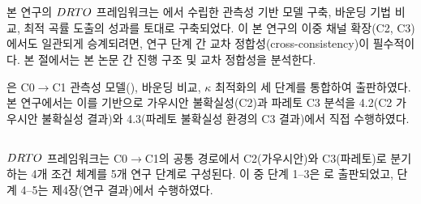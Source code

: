 

\section[\texorpdfstring{Lee and Cheung(2026)}{Lee and Cheung(2026)}과의 교차 정합성]{}
\label{sec:ch5_kci_cross}

본 연구의 $DRTO$ 프레임워크는 \citet{lee2026drto}에서 수립한
관측성 기반 모델 구축, 바운딩 기법 비교, 최적 곡률 도출의 성과를
토대로 구축되었다.
이 본 연구의
이중 채널 확장(C2, C3)에서도 일관되게 승계되려면,
연구 단계 간 교차 정합성(cross-consistency)이 필수적이다.
본 절에서는  본 논문 간 진행 구조 및 교차 정합성을 분석한다.

\citet{lee2026drto}은 C0$\to$C1 관측성 모델(),
바운딩 비교, $\kappa$ 최적화의 세 단계를 통합하여 출판하였다.
본 연구에서는 이를 기반으로 가우시안 불확실성(C2)과
파레토 C3 분석을 4.2(C2 가우시안 불확실성 결과)와 4.3(파레토 불확실성 환경의 C3 결과)에서 직접 수행하였다.


\subsection{}
\label{subsec:ch5_kci_progression}

$DRTO$ 프레임워크는 C0$\to$C1의 공통 경로에서
C2(가우시안)와 C3(파레토)로 분기하는 4개 조건 체계를
5개 연구 단계로 구성된다.
이 중 단계 1--3은 \citet{lee2026drto}로 출판되었고,
단계 4--5는 제4장(연구 결과)에서 수행하였다.

